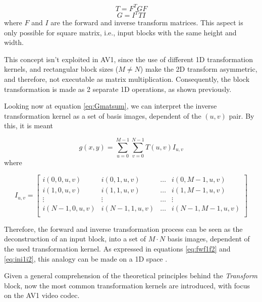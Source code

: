 \begin{equation}
    T = F^TGF 
\end{equation}
\begin{equation}
    G = I^TTI
\end{equation}
where $F$ and $I$ are the forward and inverse transform matrices. This aspect is only possible for square matrix, i.e., input blocks with the same height and width.

This concept isn't exploited in AV1, since the use of different 1D transformation kernels, and rectangular block sizes ($M \neq N$) make the 2D transform asymmetric, and therefore, not executable as matrix multiplication. Consequently, the block transformation is made as 2 separate 1D operations, as shown previously.


\textsep

Looking now at equation \ref{eq:Gmatsum}, we can interpret the inverse transformation kernel as a set of basis images, dependent of the $(u,v)$ pair. By this, it is meant 

\begin{equation}
    g(x,y) = \sum_{u=0}^{M-1}\sum_{v=0}^{N-1}T(u,v)I_{u,v}
\end{equation}
where

\begin{equation}
    I_{u,v}=\begin{bmatrix}
                i(0,0,u,v) & i(0,1,u,v) & \dots & i(0,M-1,u,v) \\
                i(1,0,u,v) & i(1,1,u,v) & \dots & i(1,M-1,u,v) \\
                \vdots     & \vdots     & \dots & \vdots       \\
                i(N-1,0,u,v) & i(N-1,1,u,v) & \dots & i(N-1,M-1,u,v) \\
            \end{bmatrix}
\end{equation}

Therefore, the forward and inverse transformation process can be seen as the deconstruction of an input block, into a set of $M \cdot N$ basis images, dependent of the used transformation kernel. As expressed in equations \ref{eq:fwf1f2} and \ref{eq:ini1i2}, this analogy can be made on a 1D space \nocite{shiImageVideoCompression2008}.


Given a general comprehension of the theoretical principles behind the \emph{Transform} block, now the most common transformation kernels are introduced, with focus on the AV1 video codec.

